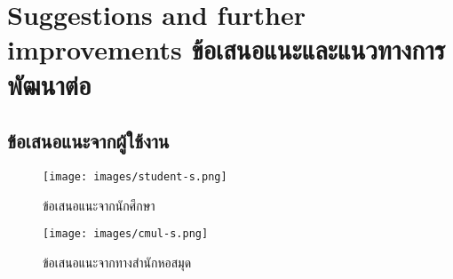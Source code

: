 \newpage
\section{\ifenglish%
Suggestions and further improvements
\else%
ข้อเสนอแนะและแนวทางการพัฒนาต่อ
\fi
}
\subsection{ข้อเสนอแนะจากผู้ใช้งาน}
\begin{figure}[ht]
    \centering
    \texttt{[image: images/student-s.png]}
    \caption[ข้อเสนอแนะจากนักศึกษา]{ข้อเสนอแนะจากนักศึกษา}
    \label{fig:st-s}
    \centering
    \texttt{[image: images/cmul-s.png]}
    \caption[ข้อเสนอแนะจากทางสำนักหอสมุด]{ข้อเสนอแนะจากทางสำนักหอสมุด}
    \label{fig:cmul-s}
\end{figure}

